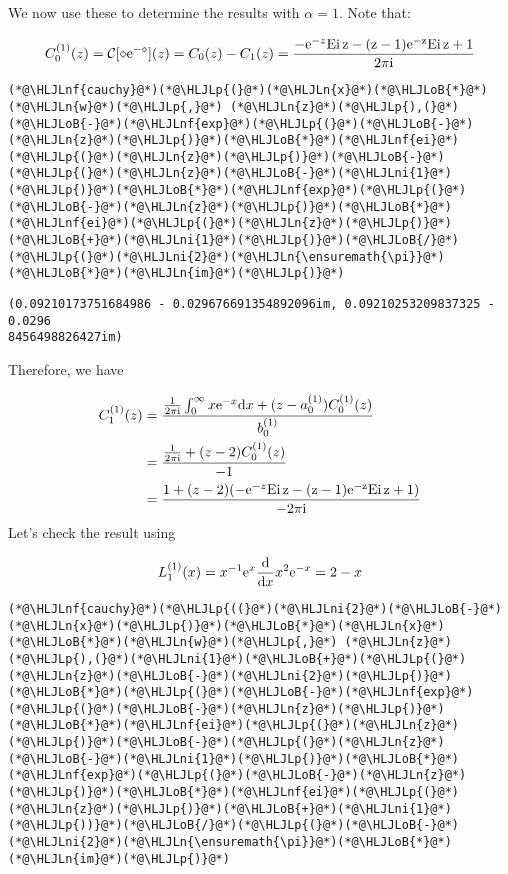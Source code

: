 \documentclass[12pt,a4paper]{article}
\newcommand{\HLJLn}[1]{#1}
\newcommand{\HLJLnf}[1]{\textcolor[RGB]{66,102,213}{#1}}
\newcommand{\HLJLni}[1]{\textcolor[RGB]{59,151,46}{#1}}
\newcommand{\HLJLoB}[1]{\textcolor[RGB]{102,102,102}{\textbf{#1}}}
\newcommand{\HLJLp}[1]{#1}
\def\D{ {\rm d} }
\def\I{ {\rm i} }
\def\E{ {\rm e} }
\def\CC{ {\cal C} }
\def\Ei{ {\rm Ei}\, }
\def\dx{\D x}
\def\Ei{\rm Ei\,}
\begin{document}
We now use these to determine the results with $\alpha = 1$. Note that:

\[
C_0^{(1)}(z) = \CC[\diamond \E^{-\diamond}](z) =C_0(z) - C_1(z) = { -\E^{-z} \Ei z - (z-1) \E^{-z} \Ei z +1 \over 2 \pi \I}
\]

\begin{lstlisting}
(*@\HLJLnf{cauchy}@*)(*@\HLJLp{(}@*)(*@\HLJLn{x}@*)(*@\HLJLoB{*}@*)(*@\HLJLn{w}@*)(*@\HLJLp{,}@*) (*@\HLJLn{z}@*)(*@\HLJLp{),(}@*)(*@\HLJLoB{-}@*)(*@\HLJLnf{exp}@*)(*@\HLJLp{(}@*)(*@\HLJLoB{-}@*)(*@\HLJLn{z}@*)(*@\HLJLp{)}@*)(*@\HLJLoB{*}@*)(*@\HLJLnf{ei}@*)(*@\HLJLp{(}@*)(*@\HLJLn{z}@*)(*@\HLJLp{)}@*)(*@\HLJLoB{-}@*)(*@\HLJLp{(}@*)(*@\HLJLn{z}@*)(*@\HLJLoB{-}@*)(*@\HLJLni{1}@*)(*@\HLJLp{)}@*)(*@\HLJLoB{*}@*)(*@\HLJLnf{exp}@*)(*@\HLJLp{(}@*)(*@\HLJLoB{-}@*)(*@\HLJLn{z}@*)(*@\HLJLp{)}@*)(*@\HLJLoB{*}@*)(*@\HLJLnf{ei}@*)(*@\HLJLp{(}@*)(*@\HLJLn{z}@*)(*@\HLJLp{)}@*)(*@\HLJLoB{+}@*)(*@\HLJLni{1}@*)(*@\HLJLp{)}@*)(*@\HLJLoB{/}@*)(*@\HLJLp{(}@*)(*@\HLJLni{2}@*)(*@\HLJLn{\ensuremath{\pi}}@*)(*@\HLJLoB{*}@*)(*@\HLJLn{im}@*)(*@\HLJLp{)}@*)
\end{lstlisting}

\begin{lstlisting}
(0.09210173751684986 - 0.029676691354892096im, 0.09210253209837325 - 0.0296
8456498826427im)
\end{lstlisting}


Therefore, we have


\begin{align*}
C_1^{(1)}(z) &= {{1 \over 2 \pi \I} \int_0^\infty x \E^{-x} \dx + (z-a_0^{(1)}) C_0^{(1)}(z) \over b_0^{(1)}} \\
&=  {{1 \over 2 \pi \I}  + (z-2) C_0^{(1)}(z) \over -1}\\
&=  {1  + (z-2) (-\E^{-z} \Ei z - (z-1) \E^{-z} \Ei z +1) \over -2 \pi \I}
\end{align*}
Let's check the result using

\[
L_1^{(1)}(x) = x^{-1} \E^x {\D \over \dx} x^2 \E^{-x} = 2 - x
\]

\begin{lstlisting}
(*@\HLJLnf{cauchy}@*)(*@\HLJLp{((}@*)(*@\HLJLni{2}@*)(*@\HLJLoB{-}@*)(*@\HLJLn{x}@*)(*@\HLJLp{)}@*)(*@\HLJLoB{*}@*)(*@\HLJLn{x}@*)(*@\HLJLoB{*}@*)(*@\HLJLn{w}@*)(*@\HLJLp{,}@*) (*@\HLJLn{z}@*)(*@\HLJLp{),(}@*)(*@\HLJLni{1}@*)(*@\HLJLoB{+}@*)(*@\HLJLp{(}@*)(*@\HLJLn{z}@*)(*@\HLJLoB{-}@*)(*@\HLJLni{2}@*)(*@\HLJLp{)}@*)(*@\HLJLoB{*}@*)(*@\HLJLp{(}@*)(*@\HLJLoB{-}@*)(*@\HLJLnf{exp}@*)(*@\HLJLp{(}@*)(*@\HLJLoB{-}@*)(*@\HLJLn{z}@*)(*@\HLJLp{)}@*)(*@\HLJLoB{*}@*)(*@\HLJLnf{ei}@*)(*@\HLJLp{(}@*)(*@\HLJLn{z}@*)(*@\HLJLp{)}@*)(*@\HLJLoB{-}@*)(*@\HLJLp{(}@*)(*@\HLJLn{z}@*)(*@\HLJLoB{-}@*)(*@\HLJLni{1}@*)(*@\HLJLp{)}@*)(*@\HLJLoB{*}@*)(*@\HLJLnf{exp}@*)(*@\HLJLp{(}@*)(*@\HLJLoB{-}@*)(*@\HLJLn{z}@*)(*@\HLJLp{)}@*)(*@\HLJLoB{*}@*)(*@\HLJLnf{ei}@*)(*@\HLJLp{(}@*)(*@\HLJLn{z}@*)(*@\HLJLp{)}@*)(*@\HLJLoB{+}@*)(*@\HLJLni{1}@*)(*@\HLJLp{))}@*)(*@\HLJLoB{/}@*)(*@\HLJLp{(}@*)(*@\HLJLoB{-}@*)(*@\HLJLni{2}@*)(*@\HLJLn{\ensuremath{\pi}}@*)(*@\HLJLoB{*}@*)(*@\HLJLn{im}@*)(*@\HLJLp{)}@*)
\end{lstlisting}
\end{document}
